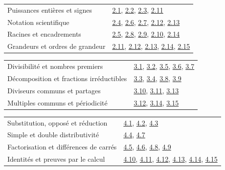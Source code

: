 \begin{tabularx}{\linewidth}{@{}Yl@{}}\toprule
Puissances entières et signes & \hyperref[exo-2-1]{2.1}, \hyperref[exo-2-2]{2.2}, \hyperref[exo-2-3]{2.3}, \hyperref[exo-2-11]{2.11}\\[2mm]
Notation scientifique & \hyperref[exo-2-4]{2.4}, \hyperref[exo-2-6]{2.6}, \hyperref[exo-2-7]{2.7}, \hyperref[exo-2-12]{2.12}, \hyperref[exo-2-13]{2.13}\\[2mm]
Racines et encadrements & \hyperref[exo-2-5]{2.5}, \hyperref[exo-2-8]{2.8}, \hyperref[exo-2-9]{2.9}, \hyperref[exo-2-10]{2.10}, \hyperref[exo-2-14]{2.14}\\[2mm]
Grandeurs et ordres de grandeur & \hyperref[exo-2-11]{2.11}, \hyperref[exo-2-12]{2.12}, \hyperref[exo-2-13]{2.13}, \hyperref[exo-2-14]{2.14}, \hyperref[exo-2-15]{2.15}\\[2mm]
\bottomrule\end{tabularx}\par\vspace{4mm}
\begin{tabularx}{\linewidth}{@{}Yl@{}}\toprule
Divisibilité et nombres premiers & \hyperref[exo-3-1]{3.1}, \hyperref[exo-3-2]{3.2}, \hyperref[exo-3-5]{3.5}, \hyperref[exo-3-6]{3.6}, \hyperref[exo-3-7]{3.7}\\[2mm]
Décomposition et fractions irréductibles & \hyperref[exo-3-3]{3.3}, \hyperref[exo-3-4]{3.4}, \hyperref[exo-3-8]{3.8}, \hyperref[exo-3-9]{3.9}\\[2mm]
Diviseurs communs et partages & \hyperref[exo-3-10]{3.10}, \hyperref[exo-3-11]{3.11}, \hyperref[exo-3-13]{3.13}\\[2mm]
Multiples communs et périodicité & \hyperref[exo-3-12]{3.12}, \hyperref[exo-3-14]{3.14}, \hyperref[exo-3-15]{3.15}\\[2mm]
\bottomrule\end{tabularx}\par\vspace{4mm}
\clearpage
{}\fontsize{10}{13}\selectfont
{}\begin{tabularx}{\linewidth}{@{}Yl@{}}\toprule
Substitution, opposé et réduction & \hyperref[exo-4-1]{4.1}, \hyperref[exo-4-2]{4.2}, \hyperref[exo-4-3]{4.3}\\[2mm]
Simple et double distributivité & \hyperref[exo-4-4]{4.4}, \hyperref[exo-4-7]{4.7}\\[2mm]
Factorisation et différences de carrés & \hyperref[exo-4-5]{4.5}, \hyperref[exo-4-6]{4.6}, \hyperref[exo-4-8]{4.8}, \hyperref[exo-4-9]{4.9}\\[2mm]
Identités et preuves par le calcul & \hyperref[exo-4-10]{4.10}, \hyperref[exo-4-11]{4.11}, \hyperref[exo-4-12]{4.12}, \hyperref[exo-4-13]{4.13}, \hyperref[exo-4-14]{4.14}, \hyperref[exo-4-15]{4.15}\\[2mm]
\bottomrule\end{tabularx}\par\vspace{4mm}
